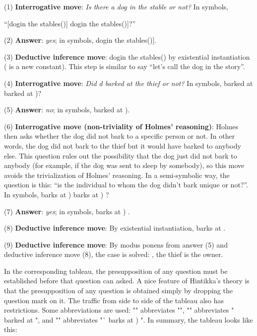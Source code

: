 \documentclass[a4paper,UKenglish]{lipics}
\begin{document}
(1)	\textbf{Interrogative move}: \emph{Is there a dog in the stable or not?} In symbols,
 
“[dog\textunderscore in \textunderscore the \textunderscore stables()] dog\textunderscore in \textunderscore the \textunderscore stables()]?”

(2)	\textbf{Answer}: \emph{yes}; in symbols,  dog\textunderscore in \textunderscore the \textunderscore stables()].

(3)	\textbf{Deductive inference move}: dog\textunderscore in \textunderscore the \textunderscore stables() by existential instantiation ( is a new constant). This step is similar to say “let’s call  the dog in the story”.

(4)	\textbf{Interrogative move}: \emph{Did d barked at the thief or not?} In symbols, 
 barked at  barked at )? 

(5)	\textbf{Answer}: \emph{no}; in symbols,  barked at ).

(6)	\textbf{Interrogative move (non-triviality of Holmes’ reasoning)}: Holmes then asks whether the dog did not bark to a specific person or not. In other words, the dog did not bark to the thief but it would have barked to anybody else. This question rules out the possibility that the dog just did not bark to anybody (for example, if the dog was sent to sleep by somebody), so this move avoids the trivialization of Holmes’ reasoning. In a semi-symbolic way, the question is this: “is the individual to whom the dog didn’t bark unique or not?”. In symbols, 
 barks at )  barks at ) ?

(7)	\textbf{Answer}: \emph{yes}; in symbols,  barks at ) .

(8)	\textbf{Deductive inference move}: By existential instantiation,  barks at .

(9)	\textbf{Deductive inference move}: By modus ponens from answer (5) and deductive inference move (8), the case is solved: , the thief is the owner.

In the corresponding tableau, the presupposition of any question must be established before that question can asked. A nice feature of Hintikka’s theory is that the presupposition of any question is obtained simply by dropping the question mark on it. The traffic from side to side of the tableau also has restrictions. Some abbreviations are used: "" abbreviates "", "" abbreviates " barked at ", and "" abbreviates "` barks at ) ". In summary, the tableau looks like this: 
\end{document}
